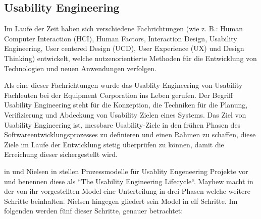 \subsection{Usability Engineering}\label{UsaEng}

\cite[S.~7]{MichaelRichter2016} Im Laufe der Zeit haben sich verschiedene Fachrichtungen (wie z. B.: Human Computer Interaction (HCI), Human Factors, Interaction Design, Usability Engineering, 
User centered Design (UCD), User Experience (UX) und Design Thinking) entwickelt, welche nutzenorientierte Methoden für die Entwicklung von Technologien und neuen Anwendungen verfolgen. 

\cite[S.~14]{MaryBethRossonJohnM.CarrollDianeD.Cerra2002} Als eine dieser Fachrichtungen wurde das Usablity Engineering von Usability Fachleuten bei der Equipment Corporation ins Leben gerufen.  
Der Begriff Usability Engineering steht für die Konzeption, die Techniken für die Planung, Verifizierung und Abdeckung von Usability Zielen eines Systems. Das Ziel von Usability Engineering ist, 
messbare Usability-Ziele in den frühen Phasen des Softwareentwicklungsprozesses zu definieren und einen Rahmen zu schaffen, diese Ziele im Laufe der Entwicklung stetig überprüfen zu können, damit die Erreichung dieser sichergestellt wird.

\citeauthor{Mayhew1999} in \cite{Mayhew1999} und Nielsen \citeauthor{Nielsen1994} in \cite{Nielsen1994} stellen Prozessmodelle für Usablity Engeneering Projekte vor und benennen diese als ``The Usability Engineering Lifecycle``. Mayhew macht in der von ihr vorgestellten Model eine Unterteilung in drei Phasen welche weitere Schritte beinhalten. Nielsen hingegen gliedert sein Model in elf Schritte. Im folgenden werden fünf 
dieser Schritte, genauer betrachtet: 

